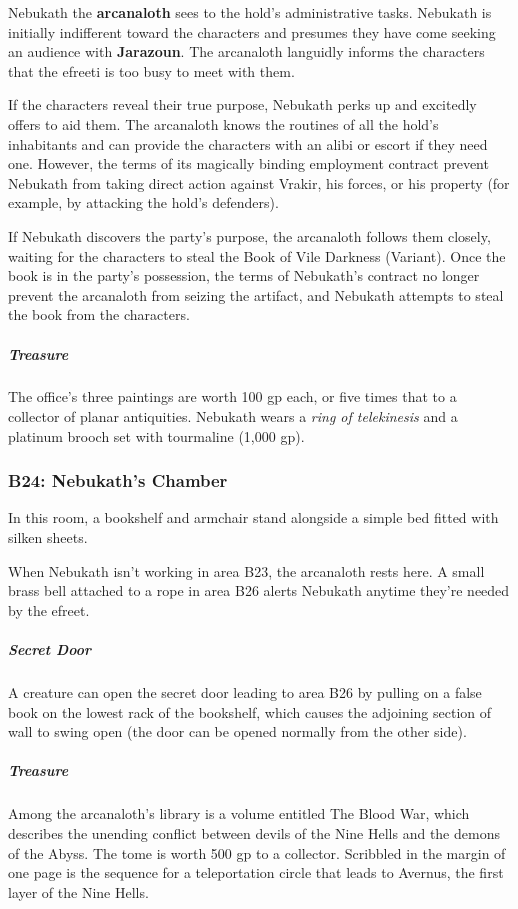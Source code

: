 \documentclass[10pt,a4paper,twoside,bg=print,twocolumn,openany,nodeprecatedcode]{dndbook}
\begin{document}
Nebukath the \textbf{arcanaloth} sees to the hold's administrative tasks. Nebukath is initially indifferent toward the characters and presumes they have come seeking an audience with \textbf{Jarazoun}. The arcanaloth languidly informs the characters that the efreeti is too busy to meet with them.

If the characters reveal their true purpose, Nebukath perks up and excitedly offers to aid them. The arcanaloth knows the routines of all the hold's inhabitants and can provide the characters with an alibi or escort if they need one. However, the terms of its magically binding employment contract prevent Nebukath from taking direct action against Vrakir, his forces, or his property (for example, by attacking the hold's defenders).

If Nebukath discovers the party's purpose, the arcanaloth follows them closely, waiting for the characters to steal the Book of Vile Darkness (Variant). Once the book is in the party's possession, the terms of Nebukath's contract no longer prevent the arcanaloth from seizing the artifact, and Nebukath attempts to steal the book from the characters.

\subparagraph{Treasure}
The office's three paintings are worth 100 gp each, or five times that to a collector of planar antiquities. Nebukath wears a \textit{ring of telekinesis} and a platinum brooch set with tourmaline (1,000 gp).

\subsubsection{B24: Nebukath's Chamber}
\begin{DndReadAloud}{}
In this room, a bookshelf and armchair stand alongside a simple bed fitted with silken sheets.

\end{DndReadAloud}

When Nebukath isn't working in area B23, the arcanaloth rests here. A small brass bell attached to a rope in area B26 alerts Nebukath anytime they're needed by the efreet.

\subparagraph{Secret Door}
A creature can open the secret door leading to area B26 by pulling on a false book on the lowest rack of the bookshelf, which causes the adjoining section of wall to swing open (the door can be opened normally from the other side).

\subparagraph{Treasure}
Among the arcanaloth's library is a volume entitled The Blood War, which describes the unending conflict between devils of the Nine Hells and the demons of the Abyss. The tome is worth 500 gp to a collector. Scribbled in the margin of one page is the sequence for a teleportation circle that leads to Avernus, the first layer of the Nine Hells.
\end{document}
